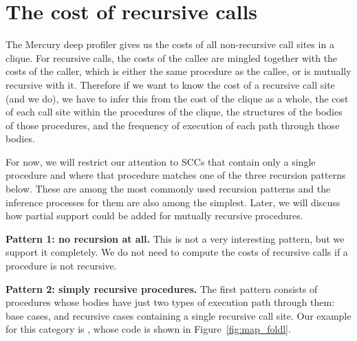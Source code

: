 


\section{The cost of recursive calls}
\label{sec:overlap_reccalls}


The Mercury deep profiler gives us
the costs of all non-recursive call sites in a clique.
For recursive calls,
the costs of the callee are mingled together
with the costs of the caller,
which is either the same procedure as the callee,
or is mutually recursive with it.
Therefore if we want to know the cost of a recursive call site (and we do),
we have to infer this
from the cost of the clique as a whole,
the cost of each call site within the procedures of the clique,
the structures of the bodies of those procedures,
and the frequency of execution of each path through those bodies.

For now, we will restrict our attention to SCCs
that contain only a single procedure and where that procedure matches one of
the three recursion patterns below.
These are among the most commonly used recursion patterns and the
inference processes for them are also among the simplest.
Later, we will discuss how partial support could be added for mutually
recursive procedures.

{\bf Pattern 1: no recursion at all.}
This is not a very interesting pattern, but we support it completely.
We do not need to compute the costs of recursive calls if a procedure is not
recursive.

{\bf Pattern 2: simply recursive procedures.}
The first pattern consists of procedures whose bodies
have just two types of execution path through them:
base cases, and recursive cases containing a single recursive call site.
Our example for this category is ,
whose code is shown in Figure~\ref{fig:map_foldl}.

